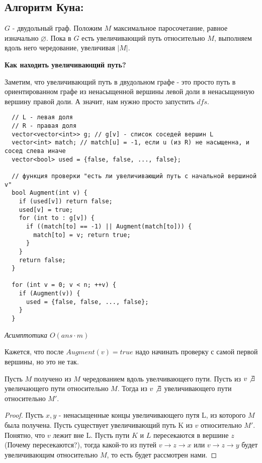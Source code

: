 \subsection{Алгоритм Куна:} $G$ - двудольный граф. Положим $M$ максимальное паросочетание, равное изначально $\varnothing$. Пока в $G$ есть увеличивающий путь относительно $M$, выполняем вдоль него чередование, увеличивая $|M|$.

\textbf{Как находить увеличивающий путь?}

Заметим, что увеличивающий путь в двудольном графе - это просто путь в ориентированном графе из ненасыщенной вершины левой доли в ненасыщенную вершину правой доли. А значит, нам нужно просто запустить $dfs$.

\begin{center}
\begin{verbatim}
  // L - левая доля 
  // R - правая доля
  vector<vector<int>> g; // g[v] - список соседей вершин L
  vector<int> match; // match[u] = -1, если u (из R) не насыщенна, и сосед слева иначе
  vector<bool> used = {false, false, ..., false};

  // функция проверки "есть ли увеличивающий путь с начальной вершиной v"
  bool Augment(int v) {
    if (used[v]) return false;
    used[v] = true;
    for (int to : g[v]) {
      if ((match[to] == -1) || Augment(match[to])) {
        match[to] = v; return true;
      }
    }
    return false;
  }

  for (int v = 0; v < n; ++v) {
    if (Augment(v)) {
      used = {false, false, ..., false};
    }
  }
\end{verbatim}
\end{center}

\textit{Асимптотика $O(ans \cdot m)$}

\begin{note}
  Кажется, что после $Augment(v) = true$ надо начинать проверку с самой первой вершины, но это не так. 
\end{note}
\begin{proposition}
  Пусть $M$ получено из $M$ чередованием вдоль увелчивающего пути. Пусть из $v   \not \exists$ увеличающего пути относительно $M$. Тогда из $v  \not \exists$ увеличивающего пути относительно $M'$.
\end{proposition}
\begin{proof}
  Пусть $x, y$ - ненасыщенные концы увеличивающего путя L, из которого $M$ была получена. Пусть существует увеличивающий путь K из $v$ относительно $M'$. Понятно, что $v$ лежит вне L. Пусть пути $K$ и $L$ пересекаются в вершине $z$ (Почему пересекаются?), тогда какой-то из путей $v \to z \to x$ или $v \to z \to y$ будет увеличивающим относительно $M$, то есть будет рассмотрен нами.
\end{proof}

